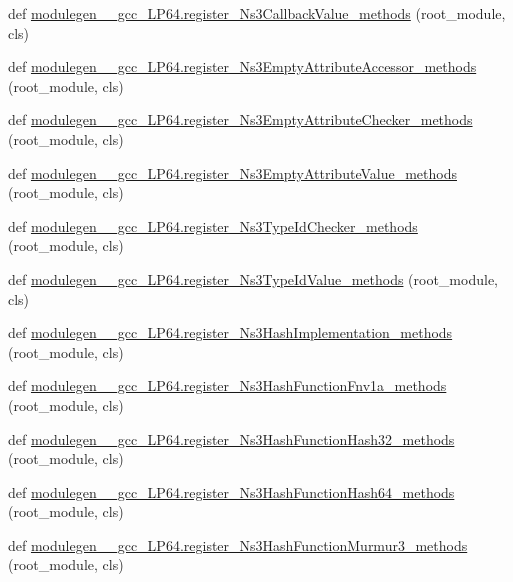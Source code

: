 \begin{DoxyCompactItemize}
\item 
def \hyperlink{namespacemodulegen____gcc__LP64_a08b703ec5906729a642f77b58b43c8d8}{modulegen\+\_\+\+\_\+gcc\+\_\+\+L\+P64.\+register\+\_\+\+Ns3\+Callback\+Value\+\_\+methods} (root\+\_\+module, cls)
\item 
def \hyperlink{namespacemodulegen____gcc__LP64_a5885028edb9b0cbbdf4f75d1388d6b19}{modulegen\+\_\+\+\_\+gcc\+\_\+\+L\+P64.\+register\+\_\+\+Ns3\+Empty\+Attribute\+Accessor\+\_\+methods} (root\+\_\+module, cls)
\item 
def \hyperlink{namespacemodulegen____gcc__LP64_aa52eca018e0116d17b4c6c2798dcee71}{modulegen\+\_\+\+\_\+gcc\+\_\+\+L\+P64.\+register\+\_\+\+Ns3\+Empty\+Attribute\+Checker\+\_\+methods} (root\+\_\+module, cls)
\item 
def \hyperlink{namespacemodulegen____gcc__LP64_a86864e6a4eb56d909f7b4550592ead3b}{modulegen\+\_\+\+\_\+gcc\+\_\+\+L\+P64.\+register\+\_\+\+Ns3\+Empty\+Attribute\+Value\+\_\+methods} (root\+\_\+module, cls)
\item 
def \hyperlink{namespacemodulegen____gcc__LP64_aaf5d00575008532556e0df2d3b8d5bef}{modulegen\+\_\+\+\_\+gcc\+\_\+\+L\+P64.\+register\+\_\+\+Ns3\+Type\+Id\+Checker\+\_\+methods} (root\+\_\+module, cls)
\item 
def \hyperlink{namespacemodulegen____gcc__LP64_ab25f30f66f8ae8da64444bac683dac7c}{modulegen\+\_\+\+\_\+gcc\+\_\+\+L\+P64.\+register\+\_\+\+Ns3\+Type\+Id\+Value\+\_\+methods} (root\+\_\+module, cls)
\item 
def \hyperlink{namespacemodulegen____gcc__LP64_afdc62559dc296b925757fa93e7cd4260}{modulegen\+\_\+\+\_\+gcc\+\_\+\+L\+P64.\+register\+\_\+\+Ns3\+Hash\+Implementation\+\_\+methods} (root\+\_\+module, cls)
\item 
def \hyperlink{namespacemodulegen____gcc__LP64_ae9b88db2dea3c59f886d0be14d039694}{modulegen\+\_\+\+\_\+gcc\+\_\+\+L\+P64.\+register\+\_\+\+Ns3\+Hash\+Function\+Fnv1a\+\_\+methods} (root\+\_\+module, cls)
\item 
def \hyperlink{namespacemodulegen____gcc__LP64_a9e34b1934e0920db80354937fe083ff8}{modulegen\+\_\+\+\_\+gcc\+\_\+\+L\+P64.\+register\+\_\+\+Ns3\+Hash\+Function\+Hash32\+\_\+methods} (root\+\_\+module, cls)
\item 
def \hyperlink{namespacemodulegen____gcc__LP64_a082871bd62d0a4db1581a4a5a90ef0ac}{modulegen\+\_\+\+\_\+gcc\+\_\+\+L\+P64.\+register\+\_\+\+Ns3\+Hash\+Function\+Hash64\+\_\+methods} (root\+\_\+module, cls)
\item 
def \hyperlink{namespacemodulegen____gcc__LP64_adca5cdfc5ab708e8c329dbbc45251f75}{modulegen\+\_\+\+\_\+gcc\+\_\+\+L\+P64.\+register\+\_\+\+Ns3\+Hash\+Function\+Murmur3\+\_\+methods} (root\+\_\+module, cls)

\end{DoxyCompactItemize}
